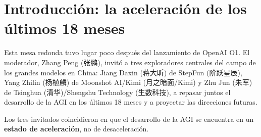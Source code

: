 \section{Introducción: la aceleración de los últimos 18 meses}

Esta mesa redonda tuvo lugar poco después del lanzamiento de OpenAI O1. El moderador, Zhang Peng (张鹏), invitó a tres exploradores centrales del campo de los grandes modelos en China: Jiang Daxin (蒋大昕) de StepFun (阶跃星辰), Yang Zhilin (杨植麟) de Moonshot AI/Kimi (月之暗面/Kimi) y Zhu Jun (朱军) de Tsinghua (清华)/Shengshu Technology (生数科技), a repasar juntos el desarrollo de la AGI en los últimos 18 meses y a proyectar las direcciones futuras.

Los tres invitados coincidieron en que el desarrollo de la AGI se encuentra en un \textbf{estado de aceleración}, no de desaceleración.

